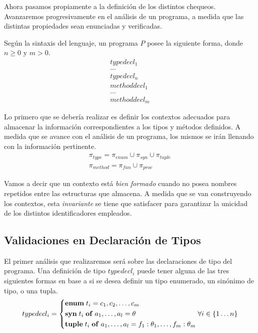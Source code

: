 \documentclass{article}
\begin{document}
Ahora pasamos propiamente a la definición de los distintos chequeos.
Avanzaremos progresivamente en el análisis de un programa, a medida que las distintas propiedades sean enunciadas y verificadas.

Según la sintaxis del lenguaje, un programa $P$ posee la siguiente forma, donde $n \geq 0$ y $m > 0$.
\begin{gather*}
typedecl_1 \\
\ldots \\
typedecl_n \\
methoddecl_1 \\
\ldots \\
methoddecl_m
\end{gather*}

Lo primero que se debería realizar es definir los contextos adecuados para almacenar la información correspondientes a los tipos y métodos definidos.
A medida que se avance con el análisis de un programa, los mismos se irán llenando con la información pertinente.
\begin{gather*}
\pi_{type} = \pi_{enum} \cup \pi_{syn} \cup \pi_{tuple}
\\
\pi_{method} = \pi_{fun} \cup \pi_{proc}
\end{gather*}

Vamos a decir que un contexto está \textit{bien formado} cuando no posea nombres repetidos entre las estructuras que almacena.
A medida que se van construyendo los contextos, esta \textit{invariante} se tiene que satisfacer para garantizar la unicidad de los distintos identificadores empleados.

\subsection{Validaciones en Declaración de Tipos}

El primer análisis que realizaremos será sobre las declaraciones de tipo del programa.
Una definición de tipo \textit{$typedecl_i$} puede tener alguna de las tres siguientes formas en base a si se desea definir un tipo enumerado, un sinónimo de tipo, o una tupla.
\begin{gather*}
typedecl_i =
\begin{cases*}
\T{enum} \; t_i = c_1, c_2, \ldots, c_m
\\
\T{syn} \; t_i \; \T{of} \; a_1, \ldots, a_l = \theta
\\
\T{tuple} \; t_i \; \T{of} \; a_1, \ldots, a_l = f_1 : \theta_1, \ldots, f_m : \theta_m
\end{cases*}
\forall i \in \{ 1 \ldots n \}
\end{gather*}
\end{document}
